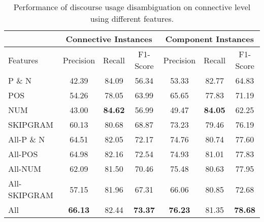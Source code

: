 \begin{table}[ht]
\centering
\begin{tabular}{|l|c|c|c|c|c|c|}
\hline
                    & \multicolumn{3}{c|}{Connective Instances}  & \multicolumn{3}{c|}{Component Instances}  \\ \hline
    Features        &     Precision &     Recall &     F1-Score  &     Precision &     Recall &     F1-Score \\ \hline
    P \& N          &     42.39     &     84.09  &     56.34     &     53.33     &     82.77  &     64.83    \\ \hline
    POS             &     54.26     &     78.05  &     63.99     &     65.65     &     77.83  &     71.19    \\ \hline
    NUM             &     43.00     & \bf 84.62  &     56.99     &     49.47     & \bf 84.05  &     62.25    \\ \hline
    SKIPGRAM        &     60.13     &     80.68  &     68.87     &     73.23     &     79.46  &     76.19    \\ \hline
    All-P \& N      &     64.51     &     82.05  &     72.17     &     74.76     &     80.74  &     77.60    \\ \hline
    All-POS         &     64.98     &     82.16  &     72.54     &     74.93     &     81.01  &     77.83    \\ \hline
    All-NUM         &     62.09     &     81.50  &     70.46     &     75.48     &     80.63  &     77.95    \\ \hline
    All-SKIPGRAM    &     57.15     &     81.96  &     67.31     &     66.06     &     80.85  &     72.68    \\ \hline
    All             & \bf 66.13     &     82.44  & \bf 73.37     & \bf 76.23     &     81.35  & \bf 78.68    \\ \hline

\end{tabular}
\caption{\label{t:recognition-connective-features} Performance of discourse usage
disambiguation on connective level using different features. }
\end{table}
